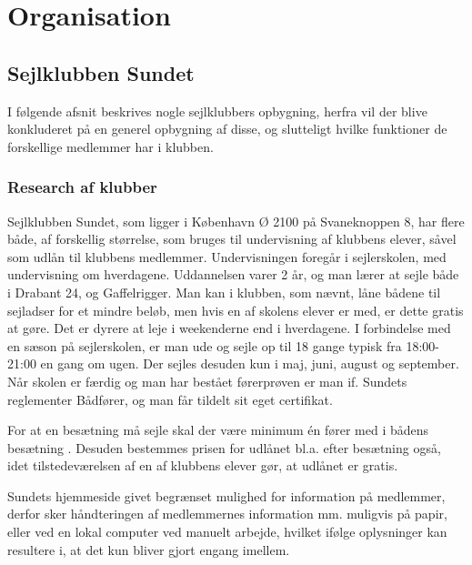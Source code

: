 \chapter{Organisation}\label{chap:organisation}

\cbstart

\section{Sejlklubben Sundet}

I følgende afsnit beskrives nogle sejlklubbers opbygning, herfra vil der blive konkluderet på en generel opbygning af
disse, og slutteligt hvilke funktioner de forskellige medlemmer har i klubben.

\subsection{Research af klubber}\label{subsec:research}


Sejlklubben Sundet, som ligger i København Ø 2100 på Svaneknoppen 8, har flere både, af forskellig størrelse, som bruges
til undervisning af klubbens elever, såvel som udlån til klubbens medlemmer. Undervisningen foregår i sejlerskolen, med
undervisning om hverdagene. Uddannelsen varer 2 år, og man lærer at sejle både i Drabant 24, og
Gaffelrigger. Man kan i klubben, som nævnt, låne bådene
til sejladser for et mindre beløb, men hvis en af skolens elever er med, er dette gratis
at gøre. Det er dyrere at leje i weekenderne end i hverdagene. I forbindelse med en sæson på sejlerskolen, er man ude
og sejle op til 18 gange typisk fra 18:00-21:00 en gang om ugen. Der sejles desuden kun i maj, juni, august og
september. Når skolen er færdig og man har bestået førerprøven er man if. Sundets reglementer Bådfører, og man får
tildelt sit eget certifikat.

For at en besætning må sejle skal der være minimum én fører med i bådens besætning . Desuden bestemmes prisen for udlånet bl.a. efter besætning også, idet tilstedeværelsen af en af klubbens elever
gør, at udlånet er gratis.\citep{Sundet}

Sundets hjemmeside givet begrænset mulighed for information på medlemmer, derfor sker håndteringen af medlemmernes
information mm. muligvis på papir, eller ved en lokal computer ved manuelt arbejde, hvilket ifølge oplysninger
 kan resultere i, at det kun bliver gjort engang imellem.

